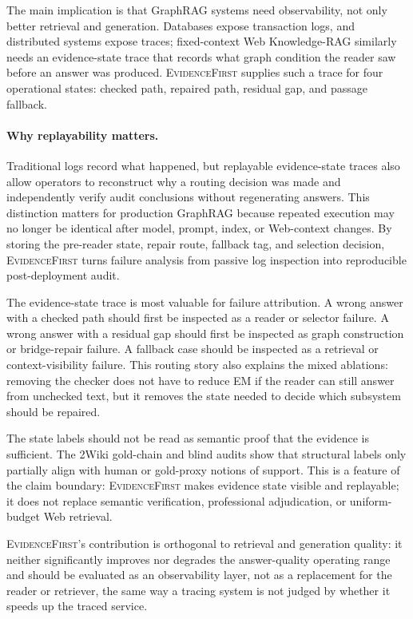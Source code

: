 \documentclass[runningheads,a4paper]{llncs}
\newcommand{\sys}{\textsc{EvidenceFirst}\xspace}
\begin{document}
The main implication is that GraphRAG systems need observability, not only
better retrieval and generation. Databases expose transaction logs, and
distributed systems expose traces; fixed-context Web Knowledge-RAG similarly
needs an evidence-state trace that records what graph condition the reader saw
before an answer was produced. \sys supplies such a trace for four operational
states: checked path, repaired path, residual gap, and passage fallback.

\paragraph{Why replayability matters.}
Traditional logs record what happened, but replayable evidence-state traces also
allow operators to reconstruct why a routing decision was made and independently
verify audit conclusions without regenerating answers. This distinction matters
for production GraphRAG because repeated execution may no longer be identical
after model, prompt, index, or Web-context changes. By storing the pre-reader
state, repair route, fallback tag, and selection decision, \sys turns failure
analysis from passive log inspection into reproducible post-deployment audit.

The evidence-state trace is most valuable for failure attribution. A wrong
answer with a checked path should first be inspected as a reader or selector
failure. A wrong answer with a residual gap should first be inspected as graph
construction or bridge-repair failure. A fallback case should be inspected as a
retrieval or context-visibility failure. This routing story also explains the
mixed ablations: removing the checker does not have to reduce EM if the reader
can still answer from unchecked text, but it removes the state needed to decide
which subsystem should be repaired.

The state labels should not be read as semantic proof that the evidence is
sufficient. The 2Wiki gold-chain and blind audits show that structural labels
only partially align with human or gold-proxy notions of support. This is a
feature of the claim boundary: \sys makes evidence state visible and replayable;
it does not replace semantic verification, professional adjudication, or
uniform-budget Web retrieval.

\sys's contribution is orthogonal to retrieval and generation quality: it
neither significantly improves nor degrades the answer-quality operating range
and should be evaluated as an observability layer, not as a replacement for the
reader or retriever, the same way a tracing system is not judged by whether it
speeds up the traced service.
\end{document}
